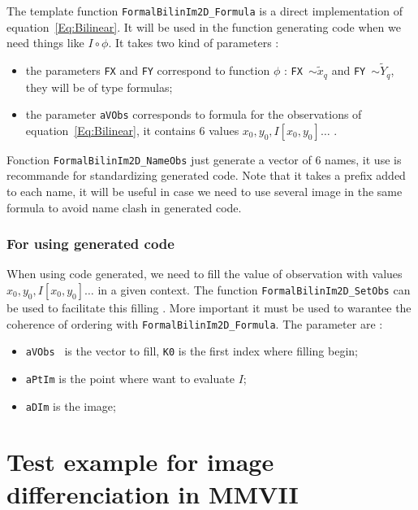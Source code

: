 The template function {\tt FormalBilinIm2D\_Formula} is a direct implementation of equation~\ref{Eq:Bilinear}.
It will be used in the function generating code when we need things like $I \circ \phi$.
It takes two kind of parameters :

\begin{itemize}
   \item the parameters {\tt FX} and {\tt FY} correspond to function $\phi$ :  
	  {\tt FX $\sim \tilde{x}_q$} and {\tt FY $\sim \tilde{Y}_q$}, 
         they will be of type formulas; 

   \item the parameter {\tt aVObs}  corresponds to formula for the observations of equation~\ref{Eq:Bilinear},
         it contains $6$ values $x_0,y_0, I[x_0,y_0] \dots$ .
\end{itemize}

Fonction {\tt FormalBilinIm2D\_NameObs} just generate a vector of $6$ names, it use is recommande for standardizing generated code.
Note that it takes a prefix added to  each name, it will be useful in case we need to use several image in the same
formula to avoid name clash in generated code.
	

\subsubsection{For using generated code}

When using code generated, we need to fill the value of observation with values    $x_0,y_0, I[x_0,y_0] \dots$
in a given context.  The function {\tt FormalBilinIm2D\_SetObs} can be used to facilitate this filling .
More important it must be used to warantee the coherence of ordering with  {\tt FormalBilinIm2D\_Formula}.
The parameter are :

\begin{itemize}
    \item {\tt aVObs } is the vector to fill, {\tt K0} is the first index where filling begin;
    \item {\tt aPtIm}  is the point where want to evaluate $I$;
    \item {\tt aDIm}  is the image;
\end{itemize}



\section{Test example for image differenciation in MMVII}


